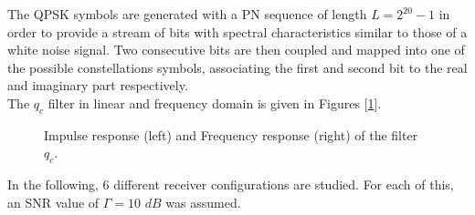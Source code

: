 \documentclass[a4paper, 12pt]{report}
\begin{document}
The QPSK symbols are generated with a PN sequence of length $L=2^{20}-1$ in order to provide a stream of bits with spectral characteristics similar to those of a white noise signal. Two consecutive bits are then coupled and mapped into one of the possible constellations symbols, associating the first and second bit to the real and imaginary part respectively. \\
The $q_c$ filter in linear and frequency domain is given in Figures [\ref{qc}].

\begin{figure}[H]
	\centering
	\caption{Impulse response (left) and Frequency response (right) of the filter $q_c$.}\label{qc}
\end{figure}

In the following, 6 different receiver configurations are studied. For each of this, an SNR value of $\Gamma = 10$ $dB$ was assumed.


\clearpage
\end{document}
